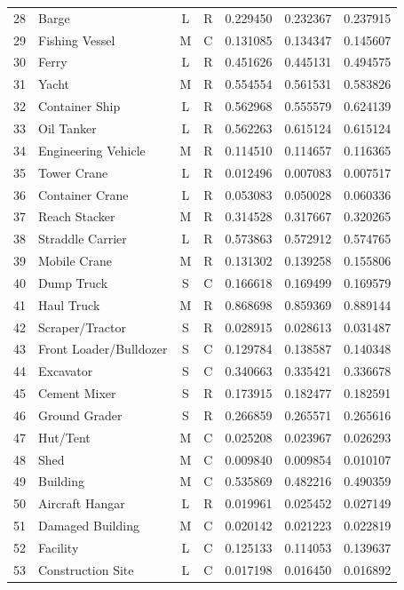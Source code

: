 \begin{center}
\begin{longtable}{|c|l|c|c|c|c|c|}
28 & Barge & L & R & 0.229450 & 0.232367 & 0.237915\\
29 & Fishing Vessel & M & C & 0.131085 & 0.134347 & 0.145607\\
30 & Ferry & L & R & 0.451626 & 0.445131 & 0.494575\\
31 & Yacht & M & R & 0.554554 & 0.561531 & 0.583826\\
32 & Container Ship & L & R & 0.562968 & 0.555579 & 0.624139\\
33 & Oil Tanker & L & R & 0.562263 & 0.615124 & 0.615124\\
34 & Engineering Vehicle & M & R & 0.114510 & 0.114657 & 0.116365\\
35 & Tower Crane & L & R & 0.012496 & 0.007083 & 0.007517\\
36 & Container Crane & L & R & 0.053083 & 0.050028 & 0.060336\\
37 & Reach Stacker & M & R & 0.314528 & 0.317667 & 0.320265\\
38 & Straddle Carrier & L & R & 0.573863 & 0.572912 & 0.574765\\
39 & Mobile Crane & M & R & 0.131302 & 0.139258 & 0.155806\\
40 & Dump Truck & S & C & 0.166618 & 0.169499 & 0.169579\\
41 & Haul Truck & M & R & 0.868698 & 0.859369 & 0.889144\\
42 & Scraper/Tractor & S & R & 0.028915 & 0.028613 & 0.031487\\
43 & Front Loader/Bulldozer & S & C & 0.129784 & 0.138587 & 0.140348\\
44 & Excavator & S & C & 0.340663 & 0.335421 & 0.336678\\
45 & Cement Mixer & S & R & 0.173915 & 0.182477 & 0.182591\\
46 & Ground Grader & S & R & 0.266859 & 0.265571 & 0.265616\\
47 & Hut/Tent & M & C & 0.025208 & 0.023967 & 0.026293\\
48 & Shed & M & C & 0.009840 & 0.009854 & 0.010107\\
49 & Building & M & C & 0.535869 & 0.482216 & 0.490359\\
50 & Aircraft Hangar & L & R & 0.019961 & 0.025452 & 0.027149\\
51 & Damaged Building & M & C & 0.020142 & 0.021223 & 0.022819\\
52 & Facility & L & C & 0.125133 & 0.114053 & 0.139637\\
53 & Construction Site & L & C & 0.017198 & 0.016450 & 0.016892\\

\end{longtable}
\end{center}
